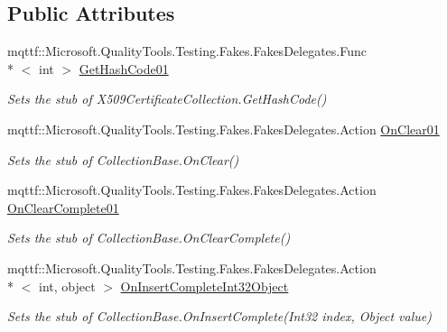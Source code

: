 \subsection*{Public Attributes}
\begin{DoxyCompactItemize}
\item 
mqttf\-::\-Microsoft.\-Quality\-Tools.\-Testing.\-Fakes.\-Fakes\-Delegates.\-Func\\*
$<$ int $>$ \hyperlink{class_system_1_1_security_1_1_cryptography_1_1_x509_certificates_1_1_fakes_1_1_stub_x509_certificate_collection_a9526c4b27796bdf093cd82e19348591e}{Get\-Hash\-Code01}
\begin{DoxyCompactList}\small\item\em Sets the stub of X509\-Certificate\-Collection.\-Get\-Hash\-Code()\end{DoxyCompactList}\item 
mqttf\-::\-Microsoft.\-Quality\-Tools.\-Testing.\-Fakes.\-Fakes\-Delegates.\-Action \hyperlink{class_system_1_1_security_1_1_cryptography_1_1_x509_certificates_1_1_fakes_1_1_stub_x509_certificate_collection_ad2d993560b29f0112c9955212815fe15}{On\-Clear01}
\begin{DoxyCompactList}\small\item\em Sets the stub of Collection\-Base.\-On\-Clear()\end{DoxyCompactList}\item 
mqttf\-::\-Microsoft.\-Quality\-Tools.\-Testing.\-Fakes.\-Fakes\-Delegates.\-Action \hyperlink{class_system_1_1_security_1_1_cryptography_1_1_x509_certificates_1_1_fakes_1_1_stub_x509_certificate_collection_a359da89ea5bf92ee6145774d04a6d0d9}{On\-Clear\-Complete01}
\begin{DoxyCompactList}\small\item\em Sets the stub of Collection\-Base.\-On\-Clear\-Complete()\end{DoxyCompactList}\item 
mqttf\-::\-Microsoft.\-Quality\-Tools.\-Testing.\-Fakes.\-Fakes\-Delegates.\-Action\\*
$<$ int, object $>$ \hyperlink{class_system_1_1_security_1_1_cryptography_1_1_x509_certificates_1_1_fakes_1_1_stub_x509_certificate_collection_a13300912c2e07cb5994f6ff197242a0f}{On\-Insert\-Complete\-Int32\-Object}
\begin{DoxyCompactList}\small\item\em Sets the stub of Collection\-Base.\-On\-Insert\-Complete(\-Int32 index, Object value)\end{DoxyCompactList}\item 

\end{DoxyCompactItemize}
